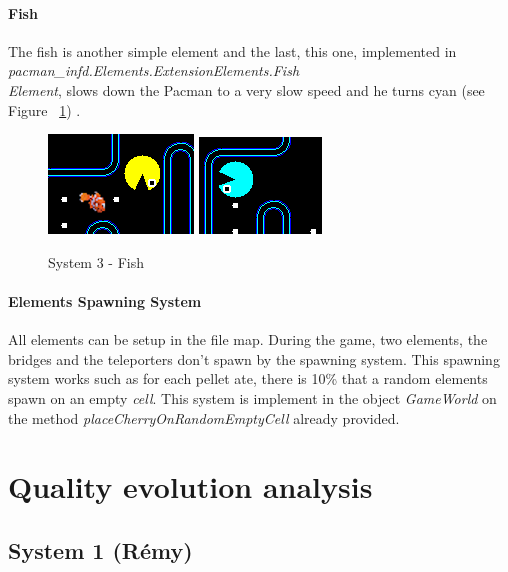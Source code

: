 \documentclass[]{article}
\begin{document}
\paragraph{Fish} The fish is another simple element and the last, this one, implemented in \textit{pacman\_infd.Elements.ExtensionElements.Fish\\Element}, slows down the Pacman to a very slow speed and he turns cyan (see Figure ~\ref{fig:system3Fish}) . 

\begin{figure}
\centering
    \includegraphics[width=.3\linewidth]{imgs/fish1.PNG}
    \includegraphics[width=.3\linewidth]{imgs/fish2.PNG}
    \caption{System 3 - Fish}
    \label{fig:system3Fish}
\end{figure}

\paragraph{Elements Spawning System} All elements can be setup in the file map. During the game, two elements, the bridges and the teleporters don't spawn by the spawning system. This spawning system works such as for each pellet ate, there is 10\% that a random elements spawn on an empty \textit{cell}. This system is implement in the object \textit{GameWorld} on the method \textit{placeCherryOnRandomEmptyCell} already provided.


\newpage

\section{Quality evolution analysis}



\subsection{System 1 (Rémy)}
\end{document}
